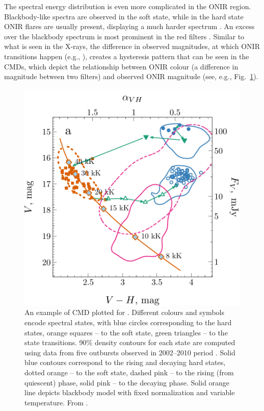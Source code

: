 The spectral energy distribution is even more complicated in the \gls{ONIR} region.
Blackbody-like spectra are observed in the soft state, while in the hard state \gls{ONIR} flares are usually present, displaying a much harder spectrum \citep{Jain2001}.
An excess over the blackbody spectrum is most prominent in the red filters \citep{Kalemci2013}.
Similar to what is seen in the X-rays, the difference in observed magnitudes, at which \gls{ONIR} transitions happen (e.g., \paperV), creates a hysteresis pattern that can be seen in the \glspl{CMD}, which depict the relationship between \gls{ONIR} colour (a difference in magnitude between two filters) and observed \gls{ONIR} magnitude (see, e.g., Fig.~\ref{fig:bh-gx-colors}).
\begin{figure}
    \centering
    \includegraphics[keepaspectratio, width = 1\linewidth]{images/CMD_Contour_04.pdf}
    \caption{
        An example of \gls{CMD} plotted for \GX. 
        Different colours and symbols encode spectral states, with blue circles corresponding to the hard states, orange squares -- to the soft state, green triangles -- to the state transitions.
        90\% density contours for each state are computed using data from five outbursts observed in 2002--2010 period \citep{Buxton2012}.
        Solid blue contours correspond to the rising and decaying hard states, dotted orange -- to the soft state, dashed pink -- to the rising (from quiescent) phase, solid pink -- to the decaying phase.
        Solid orange line depicts blackbody model with fixed normalization and variable temperature.
        From \paperV.
    }
    \label{fig:bh-gx-colors}
\end{figure}



